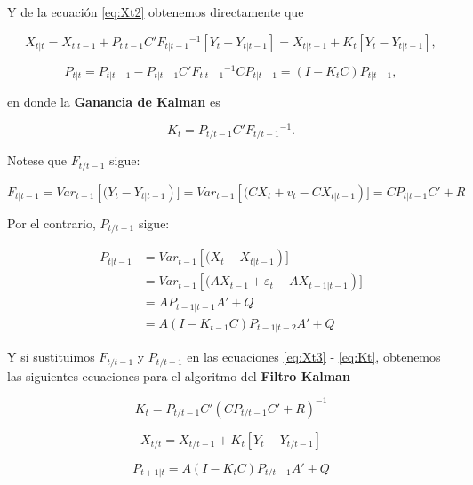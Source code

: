 \documentclass[
]{book}
\begin{document}
Y de la ecuación \eqref{eq:Xt2} obtenemos directamente que

\begin{equation}
X_{t|t} = X_{t|t-1} + P_{t|t-1} C' F_{t|t-1} {}^{-1} \left[ Y_t - Y_{t|t-1} \right] = X_{t|t-1} + K_t \left[ Y_t - Y_{t|t-1} \right],
\label{eq:Xt3}
\end{equation}

\begin{equation}
P_{t|t} = P_{t|t-1} - P_{t|t-1} C' F_{t|t-1} {}^{-1} C P_{t|t-1} = (I - K_t C) P_{t|t-1},
\label{eq:Pt}
\end{equation}

en donde la \textbf{Ganancia de Kalman} es

\begin{equation}
K_t = P_{t/t-1} C' F_{t/t-1} {}^{-1}.
\label{eq:Kt}
\end{equation}

Notese que \(F_{t/t-1}\) sigue:

\begin{equation}
F_{t|t-1} = Var_{t-1} \left[( Y_t - Y_{t|t-1} \right)] = Var_{t-1} \left[( C X_t + v_t - C X_{t|t-1} \right)] = C P_{t|t-1} C' + R
\end{equation}

Por el contrario, \(P_{t/t-1}\) sigue:

\begin{align}
P_{t|t-1} &= Var_{t-1} \left[( X_t - X_{t|t-1} \right)] 
\\ &= Var_{t-1} \left[( A X_{t-1} + \varepsilon_t - A X_{t-1|t-1} \right)] 
\\ &= A P_{t-1|t-1} A' + Q 
\\ &= A (I - K_{t-1} C) P_{t-1|t-2} A' + Q
\end{align}

Y si sustituimos \(F_{t/t-1}\) y \(P_{t/t-1}\) en las ecuaciones \eqref{eq:Xt3} - \eqref{eq:Kt}, obtenemos las siguientes ecuaciones para el algoritmo del \textbf{Filtro Kalman}

\begin{equation}
K_t = P_{t/t-1} C' (C P_{t/t-1} C' + R)^{-1}
\label{eq:Kt1}
\end{equation}

\begin{equation}
X_{t/t} = X_{t/t-1} + K_t [Y_t - Y_{t/t-1}]
\label{eq:Xt4}
\end{equation}

\begin{equation}
P_{t+1|t} = A (I - K_t C) P_{t/t-1} A' + Q
\label{eq:Pt1}
\end{equation}
\end{document}
